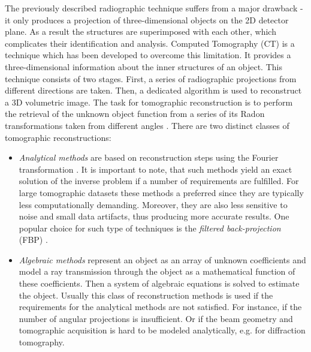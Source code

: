 The previously described radiographic technique suffers from a major drawback - it only produces a projection of three-dimensional objects on the 2D detector plane. As a result the structures are superimposed with each other, which complicates their identification and analysis. Computed Tomography (CT) is a technique which has been developed to overcome this limitation. It provides a three-dimensional information about the inner structures of an object.
This technique consists of two stages. First, a series of radiographic projections from different directions are taken.
Then, a dedicated  algorithm is used to reconstruct a 3D volumetric image. 
The task for tomographic reconstruction is to perform the retrieval of the unknown object function from a series of its Radon transformations taken from different angles \cite{Kak01}.
There are two distinct classes of tomographic reconstructions:
\begin{itemize}
\item \textit{Analytical methods} are based on reconstruction steps using the Fourier transformation \cite{Kak01}. It is important to note, that such methods yield an exact solution of the inverse problem if a number of requirements are fulfilled. For large tomographic datasets these methods a preferred since they are typically less computationally demanding. Moreover, they are also less sensitive to noise and small data artifacts, thus producing more accurate results. One popular choice for such type of techniques is the \textit{filtered back-projection} (FBP) \cite{Kak01}.

\item \textit{Algebraic methods} represent an object as an array of unknown coefficients and model a ray transmission through the object as a mathematical function of these coefficients. Then a system of algebraic equations is solved to estimate the object. Usually this class of reconstruction methods is used if the requirements for the analytical methods are not satisfied. For instance, if the number of angular projections is insufficient. Or if the beam geometry and tomographic acquisition is hard to be modeled analytically, e.g. for diffraction tomography.         
\end{itemize}


